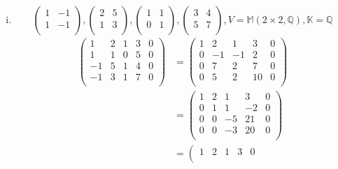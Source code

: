 \documentclass{article}
\begin{document}
\begin{enumerate}[(i)]
\newpage
\item
  \[
    \begin{pmatrix}
      1 & -1 \\
      1 & -1 \\
    \end{pmatrix},
    \begin{pmatrix}
      2 & 5 \\
      1 & 3 \\
    \end{pmatrix},
    \begin{pmatrix}
      1 & 1 \\
      0 & 1 \\
    \end{pmatrix},
    \begin{pmatrix}
      3 & 4 \\
      5 & 7 \\
    \end{pmatrix},
    V = \mathbb{M}(2 \times 2, \mathbb{Q}), \mathbb{K} = \mathbb{Q}
  \]
  \begin{align*}
    \left(
    \begin{array}{cccc|c}
      1  & 2 & 1 & 3 & 0 \\
      1  & 1 & 0 & 5 & 0 \\
      -1 & 5 & 1 & 4 & 0 \\
      -1 & 3 & 1 & 7 & 0 \\
    \end{array}
    \right)
    &=
    \left(
    \begin{array}{cccc|c}
      1  & 2  & 1  & 3  & 0 \\
      0  & -1 & -1 & 2  & 0 \\
      0  & 7  & 2  & 7  & 0 \\
      0  & 5  & 2  & 10 & 0 \\
    \end{array}
    \right) \\
    &=
    \left(
    \begin{array}{cccc|c}
      1  & 2 &  1 & 3  & 0 \\
      0  & 1 &  1 & -2 & 0 \\
      0  & 0 & -5 & 21 & 0 \\
      0  & 0 & -3 & 20 & 0 \\
    \end{array}
    \right) \\
    &=
    \left(
    \begin{array}{cccc|c}
      1  & 2 & 1 & 3             & 0 \\

\end{array}
\end{align*}
\end{enumerate}
\end{document}
